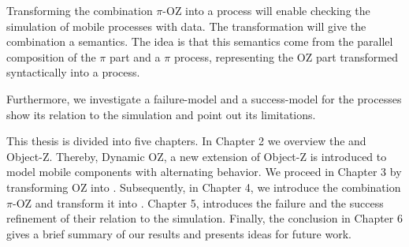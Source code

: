  Transforming the combination $\pi$-OZ into a \picalc{} process will enable checking the simulation of mobile processes with data. The transformation will give the combination a \picalc{} semantics. The idea is that this semantics come from the parallel composition of the $\pi$ part and a $\pi$ process, representing the OZ part transformed syntactically into a \picalc{} process.

 Furthermore, we investigate a failure-model and a success-model for the \picalc{} processes show its relation to the simulation and point out its limitations.

This thesis is divided into five chapters. In Chapter 2 we overview the \picalc{} and Object-Z. Thereby, Dynamic OZ, a new extension of Object-Z is introduced to model mobile components with alternating behavior. We proceed in Chapter 3 by transforming OZ into \picalc{}. Subsequently, in Chapter 4, we introduce the combination $\pi$-OZ and transform it into \picalc{}. Chapter 5, introduces the failure and the success refinement of \picalc{} their relation to the simulation. Finally, the conclusion in Chapter 6 gives a brief summary of our results and presents ideas for future work.

